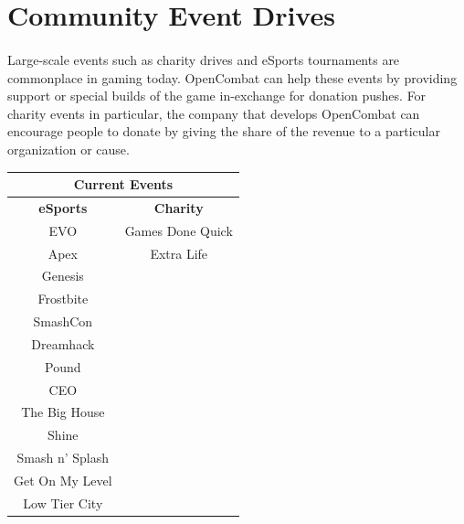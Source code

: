 \pagebreak

\section{Community Event Drives}

\paragraph{} Large-scale events such as charity drives and eSports tournaments are commonplace in gaming today. OpenCombat can help these events by providing support or special builds of the game in-exchange for donation pushes. For charity events in particular, the company that develops OpenCombat can encourage people to donate by giving the share of the revenue to a particular organization or cause.

\begin{table}[h!]
    \centering
    \begin{tabular}{|c|c|}
        \hline
        \multicolumn{2}{|c|}{\textbf{Current Events}}\\
        \hline
        \textbf{eSports} & \textbf{Charity} \\
        \hline
        EVO & Games Done Quick\\
        \hline
        Apex & Extra Life\\
        \hline
        Genesis & \\
        \hline
        Frostbite & \\
        \hline
        SmashCon & \\
        \hline
        Dreamhack & \\
        \hline
        Pound & \\
        \hline
        CEO & \\
        \hline
        The Big House & \\
        \hline
        Shine & \\
        \hline
        Smash n' Splash & \\
        \hline
        Get On My Level & \\
        \hline
        Low Tier City & \\
        \hline
    \end{tabular}
\end{table}